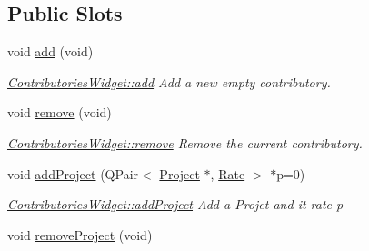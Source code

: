 \subsection*{Public Slots}
\begin{DoxyCompactItemize}
\item 
\hypertarget{classGui_1_1Widgets_1_1ContributoriesWidget_a756c0d1076fad1a3805975343e66a1de}{void \hyperlink{classGui_1_1Widgets_1_1ContributoriesWidget_a756c0d1076fad1a3805975343e66a1de}{add} (void)}\label{classGui_1_1Widgets_1_1ContributoriesWidget_a756c0d1076fad1a3805975343e66a1de}

\begin{DoxyCompactList}\small\item\em \hyperlink{classGui_1_1Widgets_1_1ContributoriesWidget_ae61498391d4aaf199bed8183961d515c}{Contributories\-Widget\-::add} Add a new empty contributory. \end{DoxyCompactList}\item 
\hypertarget{classGui_1_1Widgets_1_1ContributoriesWidget_a35895ad0b9c497263f633680288b414e}{void \hyperlink{classGui_1_1Widgets_1_1ContributoriesWidget_a35895ad0b9c497263f633680288b414e}{remove} (void)}\label{classGui_1_1Widgets_1_1ContributoriesWidget_a35895ad0b9c497263f633680288b414e}

\begin{DoxyCompactList}\small\item\em \hyperlink{classGui_1_1Widgets_1_1ContributoriesWidget_a35895ad0b9c497263f633680288b414e}{Contributories\-Widget\-::remove} Remove the current contributory. \end{DoxyCompactList}\item 
void \hyperlink{classGui_1_1Widgets_1_1ContributoriesWidget_afaa982bf1f4b77fd3bf55be0c83c4056}{add\-Project} (Q\-Pair$<$ \hyperlink{classModels_1_1Project}{Project} $\ast$, \hyperlink{classModels_1_1Rate}{Rate} $>$ $\ast$p=0)
\begin{DoxyCompactList}\small\item\em \hyperlink{classGui_1_1Widgets_1_1ContributoriesWidget_afaa982bf1f4b77fd3bf55be0c83c4056}{Contributories\-Widget\-::add\-Project} Add a Projet and it rate {\itshape p} \end{DoxyCompactList}\item 
\hypertarget{classGui_1_1Widgets_1_1ContributoriesWidget_ad907c5827c4e1ee3b82adbe6f2f77309}{void \hyperlink{classGui_1_1Widgets_1_1ContributoriesWidget_ad907c5827c4e1ee3b82adbe6f2f77309}{remove\-Project} (void)}\label{classGui_1_1Widgets_1_1ContributoriesWidget_ad907c5827c4e1ee3b82adbe6f2f77309}


\end{DoxyCompactItemize}
